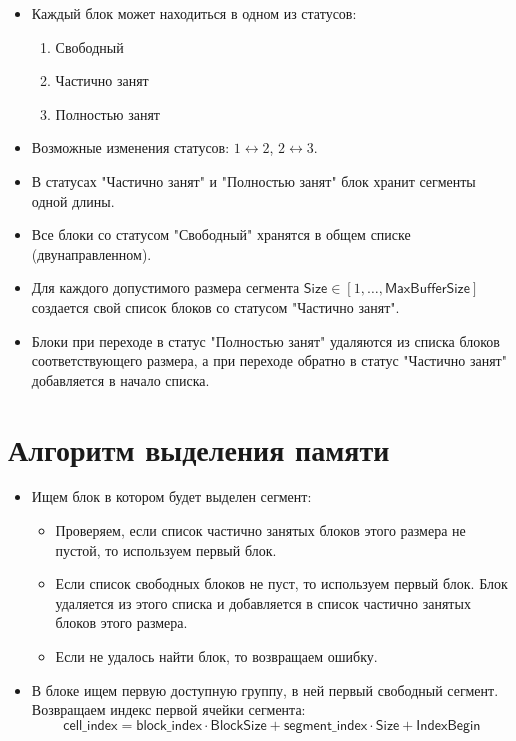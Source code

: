 \documentclass[12pt, a4paper]{article}
\begin{document}
	\begin{itemize}
		\item Каждый блок может находиться в одном из статусов:
			\begin{enumerate}
				\item Свободный
				\item Частично занят
				\item Полностью занят
			\end{enumerate}
		
		\item Возможные изменения статусов: $1 \leftrightarrow 2 $, $2 \leftrightarrow 3 $.
		
		\item В статусах "Частично занят" и "Полностью занят" блок хранит сегменты одной длины.
		
		\item Все блоки со статусом "Свободный" хранятся в общем списке (двунаправленном).
		
		\item Для каждого допустимого размера сегмента 
		$\textsf{Size} \in \left[ 1,\ldots ,\textsf{MaxBufferSize}\right] $ создается свой список блоков
		со статусом "Частично занят".
		
		\item Блоки при переходе в статус "Полностью занят" удаляются из списка блоков соответствующего размера,
		а при переходе обратно в статус "Частично занят" добавляется в начало списка.
		
	\end{itemize}

	\section{Алгоритм выделения памяти}
	
	\begin{itemize}
		\item Ищем блок в котором будет выделен сегмент:
			\begin{itemize}
				\item Проверяем, если список частично занятых блоков этого размера не пустой,
				то используем первый блок.
				\item Если список свободных блоков не пуст, то используем первый блок. Блок удаляется
				из этого списка и добавляется в список частично занятых блоков этого размера.
				\item Если не удалось найти блок, то возвращаем ошибку.
			\end{itemize}
		
		\item В блоке ищем первую доступную группу, в ней первый свободный сегмент. Возвращаем
		индекс первой ячейки сегмента:
		$$ \textsf{cell\_index} = \textsf{block\_index} \cdot \textsf{BlockSize} + 
		\textsf{segment\_index} \cdot \textsf{Size} + \textsf{IndexBegin} $$
	
	\end{itemize}
\end{document}
